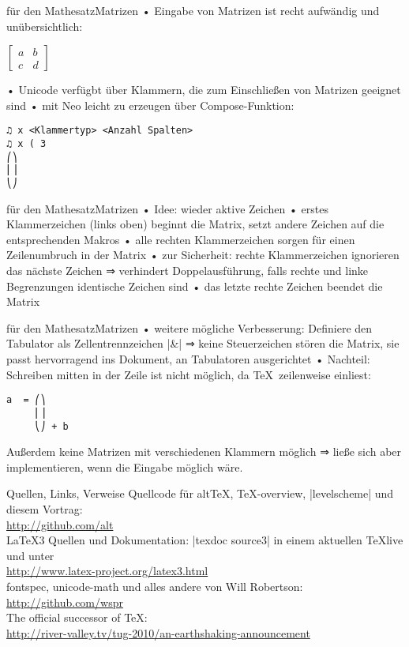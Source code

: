 \documentclass[t]{beamer}
\begin{document}
\begin{frame}[fragile]{\altTeX für den Mathesatz}{Matrizen}
• Eingabe von Matrizen ist recht aufwändig und unübersichtlich:
\•
\begin{LTXexample}[pos=b,preset={\centering}]
$\begin{bmatrix} a & b \\ c & d \end{bmatrix}$
\end{LTXexample}
• Unicode verfügbt über Klammern, die zum Einschließen von Matrizen geeignet sind
• mit Neo leicht zu erzeugen über Compose-Funktion:
\•
\pause
\begin{verbatim}
♫ x <Klammertyp> <Anzahl Spalten>
♫ x ( 3
⎛⎞
⎜⎟
⎝⎠
\end{verbatim}
\end{frame}


\begin{frame}[fragile]{\altTeX für den Mathesatz}{Matrizen}
• Idee: wieder aktive Zeichen
• erstes Klammerzeichen (links oben) beginnt die Matrix, setzt andere Zeichen auf die entsprechenden Makros
• alle rechten Klammerzeichen sorgen für einen Zeilenumbruch in der Matrix
• zur Sicherheit: rechte Klammerzeichen ignorieren das nächste Zeichen ⇒ verhindert Doppelausführung, falls rechte und linke Begrenzungen identische Zeichen sind
• das letzte rechte Zeichen beendet die Matrix
\•
\end{frame}

\begin{frame}[fragile]{\altTeX für den Mathesatz}{Matrizen}
• weitere mögliche Verbesserung: Definiere den Tabulator als Zellentrennzeichen |&| ⇒ keine Steuerzeichen stören die Matrix, sie passt hervorragend ins Dokument, an Tabulatoren ausgerichtet\pause
• Nachteil: Schreiben mitten in der Zeile ist nicht möglich, da \TeX\ zeilenweise einliest:
\•
\begin{verbatim}
a  = ⎛⎞
     ⎜⎟
     ⎝⎠ + b
\end{verbatim}
Außerdem keine Matrizen mit verschiedenen Klammern möglich ⇒ ließe sich aber implementieren, wenn die Eingabe möglich wäre.
\end{frame}

\begin{frame}{Quellen, Links, Verweise}
Quellcode für alt\TeX, \TeX-overview, |levelscheme| und diesem Vortrag:\\
\url{http://github.com/alt}\\
\LaTeX3 Quellen und Dokumentation: |texdoc source3| in einem aktuellen \TeX live und unter\\
\url{http://www.latex-project.org/latex3.html}\\
fontspec, unicode-math und alles andere von Will Robertson:\\
\url{http://github.com/wspr}\\
The official successor of \TeX:\\
\url{http://river-valley.tv/tug-2010/an-earthshaking-announcement}

\end{frame}
\end{document}

